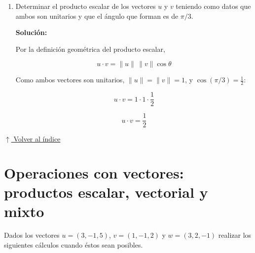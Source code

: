 \documentclass[12pt]{article}
\newcommand{\solucion}{%
    \vspace{0.8em}%
    \textbf{Solución:}%
    \vspace{0.8em}%
}
\newcommand{\volverindice}{%
    \vspace{1em}%
    \begin{flushright}%
        \hyperlink{indice}{\small $\uparrow$ Volver al índice}%
    \end{flushright}%
}
\begin{document}
\begin{enumerate}[label=\alph*.-]
    \[
    \|v\|=\sqrt{3^2+2^2+(-1)^2}=\sqrt{9+4+1}
    \]

    \[
    \boxed{\|v\|=\sqrt{14}}
    \]

    \item Determinar el producto escalar de los vectores $u$ y $v$ teniendo
    como datos que ambos son unitarios y que el ángulo que forman es de
    $\pi/3$.

    \solucion

    Por la definición geométrica del producto escalar,

    \[
    u\cdot v=\|u\|\,\|v\|\cos\theta
    \]

    Como ambos vectores son unitarios, $\|u\|=\|v\|=1$, y
    $\cos(\pi/3)=\tfrac{1}{2}$:

    \[
    u\cdot v=1\cdot1\cdot\frac{1}{2}
    \]

    \[
    \boxed{u\cdot v=\frac{1}{2}}
    \]

\end{enumerate}

\volverindice
\newpage


\section{Operaciones con vectores: productos escalar, vectorial y mixto}

Dados los vectores $u=(3,-1,5)$, $v=(1,-1,2)$ y $w=(3,2,-1)$ realizar los
siguientes cálculos cuando éstos sean posibles.
\end{document}
